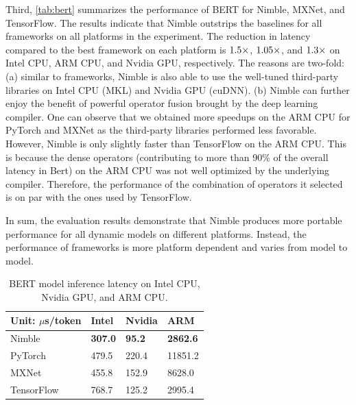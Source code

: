 Third, \autoref{tab:bert} summarizes the performance of BERT for Nimble, MXNet, and TensorFlow. The results indicate that Nimble outstrips the baselines for all frameworks on all platforms in the experiment. The reduction in latency compared to the best framework on each platform is $\fpeval{round(455.8/307, 1)}\times$, $\fpeval{round(2995.4/2862.6, 2)}\times$, and $\fpeval{round(125.2/95.2, 1)}\times$ on Intel CPU, ARM CPU, and Nvidia GPU, respectively.
The reasons are two-fold: (a) similar to frameworks, Nimble is also able to use the well-tuned third-party libraries on Intel CPU (MKL) and Nvidia GPU (cuDNN). (b) Nimble can further enjoy the benefit of powerful operator fusion brought by the deep learning compiler. One can observe that we obtained more speedups on the ARM CPU for PyTorch and MXNet as the third-party libraries performed less favorable. However, Nimble is only slightly faster than TensorFlow on the ARM CPU. This is because the dense operators (contributing to more than 90\% of the overall latency in Bert) on the ARM CPU was not well optimized by the underlying compiler. Therefore, the performance of the combination of operators it selected is on par with the ones used by TensorFlow.

In sum, the evaluation results demonstrate that Nimble produces more portable performance for all dynamic models on different platforms. Instead, the performance of frameworks is more platform dependent and varies from model to model.

\begin{table}[t]
\centering
\begin{tabular}{l|lll}
\toprule
Unit: $\mu$s/token    & Intel  &   Nvidia       &  ARM     \\ \midrule
Nimble     & \bf{307.0} & \bf{95.2} & \bf{2862.6} \\
PyTorch & 479.5 & 220.4 & 11851.2 \\
MXNet      & 455.8 & 152.9 & 8628.0   \\
TensorFlow & 768.7 & 125.2 & 2995.4 \\
\bottomrule
\end{tabular}
\caption{BERT model inference latency on Intel CPU, Nvidia GPU, and ARM CPU.}
\label{tab:bert}
\vspace{-1em}
\end{table}


